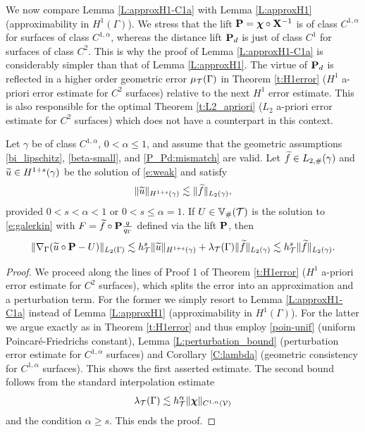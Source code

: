 We now compare Lemma \ref{L:approxH1-C1a} with Lemma \ref{L:approxH1} (approximability in $H^1(\Gamma)$). We stress that the lift ${\bf P}={\boldsymbol \chi}\circ{\bf X}^{-1}$ is of class $C^{1,\alpha}$ for surfaces of class $C^{1,\alpha}$, whereas the distance lift ${\bf P}_d$ is just of class $C^1$ for surfaces of class $C^2$. This is why the proof of Lemma \ref{L:approxH1-C1a} is considerably simpler than that of Lemma \ref{L:approxH1}. The virtue of ${\bf P}_d$ is reflected in a higher order geometric error $\mu_{\mathcal{T}}(\Gamma)$ in Theorem \ref{t:H1error} ($H^1$ a-priori error estimate for $C^2$ surfaces) relative to the next $H^1$ error estimate. This is also responsible for the optimal Theorem \ref{t:L2_apriori} ($L_2$ a-priori error estimate for $C^2$ surfaces) which does not have a counterpart in this context.

  
\begin{theorem} \label{t:H1errorC1a}
  Let $\gamma$ be of class $C^{1,\alpha}$, $0<\alpha\leq 1$,  and assume that the geometric assumptions \eqref{bi_lipschitz},
\eqref{beta-small}, and \eqref{P_Pd:mismatch} are valid.
 Let $\widetilde{f} \in L_{2,\#}(\gamma)$ and $\widetilde{u}\in H^{1+s}(\gamma)$ be the solution of \eqref{e:weak} and satisfy
%
\[
\|\widetilde{u}\|_{H^{1+s}(\gamma)} \lesssim \|\widetilde{f}\|_{L_2(\gamma)},
\]
%
provided $0<s<\alpha<1$ or $0<s\le\alpha=1$.
%
If $U \in \mathbb{V}_\#(\mathcal{T})$ is the solution to \eqref{e:galerkin} with $F =\widetilde{f} \circ {\bf P} \frac{q}{q_\Gamma}$ defined via the lift ${\bf P}$, then
$$
\| \nabla_\Gamma (\widetilde{u} \circ {\bf P} -U)\|_{L_2 (\Gamma)}\lesssim h_{\mathcal{T}}^s \|\widetilde{u}\|_{H^{1+s}(\gamma)}
+ \lambda_{\mathcal{T}}(\Gamma) \| \widetilde{f} \|_{L_{2}(\gamma)} \lesssim  h_{\mathcal{T}}^s \| \widetilde{f} \|_{L_{2}(\gamma)}.
$$
\end{theorem}
%
\begin{proof}
  We proceed along the lines of Proof 1 of Theorem \ref{t:H1error} ($H^1$ a-priori error estimate for $C^2$ surfaces), which splits the error into an approximation and a perturbation term. For the former we simply resort to Lemma \ref{L:approxH1-C1a} instead of
  Lemma \ref{L:approxH1} (approximability in $H^1(\Gamma)$). For the latter we argue exactly as in Theorem \ref{t:H1error} and thus employ \eqref{poin-unif} (uniform Poincar\'e-Friedrichs constant), Lemma \ref{L:perturbation_bound} (perturbation error estimate for $C^{1,\alpha}$ surfaces) and Corollary \ref{C:lambda} (geometric consistency for $C^{1,\alpha}$ surfaces). This shows the first asserted estimate.
%
The second bound follows from the standard interpolation estimate
$$
\lambda_{\mathcal{T}}(\Gamma) \lesssim h_{\mathcal{T}}^{\alpha} \| {\boldsymbol \chi} \|_{C^{1,\alpha}(\mathcal{V})}
$$
and the condition $\alpha \ge s$. This ends the proof.
\end{proof}


